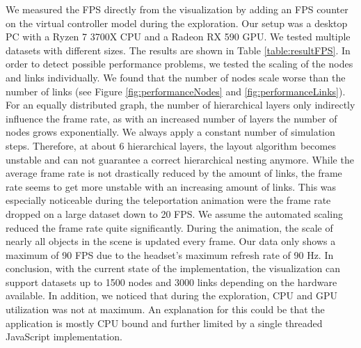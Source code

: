 We measured the FPS directly from the visualization by adding an FPS counter on the virtual controller model during the exploration. Our setup was a desktop PC with a Ryzen 7 3700X CPU and a Radeon RX 590 GPU. 
We tested multiple datasets with different sizes. The results are shown in Table \ref{table:resultFPS}. 
In order to detect possible performance problems, we tested the scaling of the nodes and links individually.
We found that the number of nodes scale worse than the number of links (see Figure \ref{fig:performanceNodes} and \ref{fig:performanceLinks}). 
For an equally distributed graph, the number of hierarchical layers only indirectly influence the frame rate, as with an increased number of layers the number of nodes grows exponentially.
We always apply a constant number of simulation steps. Therefore, at about 6 hierarchical layers, the layout algorithm becomes unstable and can not guarantee a correct hierarchical nesting anymore.
While the average frame rate is not drastically reduced by the amount of links, the frame rate seems to get more unstable with an increasing amount of links. 
This was especially noticeable during the teleportation animation were the frame rate dropped on a large dataset down to 20 FPS. 
We assume the automated scaling reduced the frame rate quite significantly. During the animation, the scale of nearly all objects in the scene is updated every frame.
Our data only shows a maximum of 90 FPS due to the headset's maximum refresh rate of 90 Hz.
In conclusion, with the current state of the implementation, the visualization can support datasets up to 1500 nodes and 3000 links depending on the hardware available.
In addition, we noticed that during the exploration, CPU and GPU utilization was not at maximum. An explanation for this could be that the application is mostly CPU bound and further limited by a single threaded JavaScript implementation.

